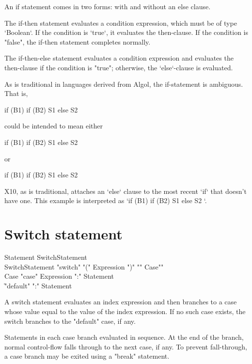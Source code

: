 An if statement comes in two forms: with and without an else
clause.

The if-then statement evaluates a condition expression, which must be of type
\xcd`Boolean`. If the condition is \xcd`true`, it evaluates the then-clause.
If the condition is \xcd"false", the if-then statement completes normally.

The if-then-else statement evaluates a condition expression and 
evaluates the then-clause if the condition is
\xcd"true"; otherwise, the \xcd`else`-clause is evaluated.

As is traditional in languages derived from Algol, the if-statement is
ambiguous.  That is, 
\begin{xten}
if (B1) if (B2) S1 else S2
\end{xten}
could be intended to mean either 
\begin{xten}
if (B1) { if (B2) S1 else S2 }
\end{xten} 
or 
\begin{xten}
if (B1) {if (B2) S1} else S2
\end{xten}
X10, as is traditional, attaches an \xcd`else` clause to the most recent
\xcd`if` that doesn't have one.
This example is interpreted as 
\xcd`if (B1) { if (B2) S1 else S2 }`. 



\section{Switch statement}

\begin{grammar}
Statement \: SwitchStatement \\
SwitchStatement \: \xcd"switch" \xcd"(" Expression \xcd")" \xcd"{" Case\plus \xcd"}" \\
Case \: \xcd"case" Expression \xcd":" Statement\star \\
     \| \xcd"default" \xcd":" Statement\star \\
\end{grammar}

A switch statement evaluates an index expression and then branches to
a case whose value equal to the value of the index expression.
If no such case exists, the switch branches to the 
\xcd"default" case, if any.

Statements in each case branch evaluated in sequence.  At the
end of the branch, normal control-flow falls through to the next case, if
any.  To prevent fall-through, a case branch may be exited using
a \xcd"break" statement.

